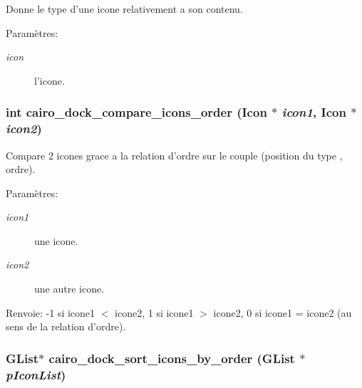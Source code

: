 Donne le type d'une icone relativement a son contenu. \begin{Desc}
\item[Paramètres:]
\begin{description}
\item[{\em icon}]l'icone. \end{description}
\end{Desc}
\subsubsection{\setlength{\rightskip}{0pt plus 5cm}int cairo\_\-dock\_\-compare\_\-icons\_\-order ({\bf Icon} $\ast$ {\em icon1}, {\bf Icon} $\ast$ {\em icon2})}\label{cairo-dock-icons_8h_a4e008f173bb3255251da119e4173c3b}


Compare 2 icones grace a la relation d'ordre sur le couple (position du type , ordre). \begin{Desc}
\item[Paramètres:]
\begin{description}
\item[{\em icon1}]une icone. \item[{\em icon2}]une autre icone. \end{description}
\end{Desc}
\begin{Desc}
\item[Renvoie:]-1 si icone1 $<$ icone2, 1 si icone1 $>$ icone2, 0 si icone1 = icone2 (au sens de la relation d'ordre). \end{Desc}
\subsubsection{\setlength{\rightskip}{0pt plus 5cm}GList$\ast$ cairo\_\-dock\_\-sort\_\-icons\_\-by\_\-order (GList $\ast$ {\em pIconList})}\label{cairo-dock-icons_8h_f1bef19a6b85b6a6e27feb40cefd400b}


